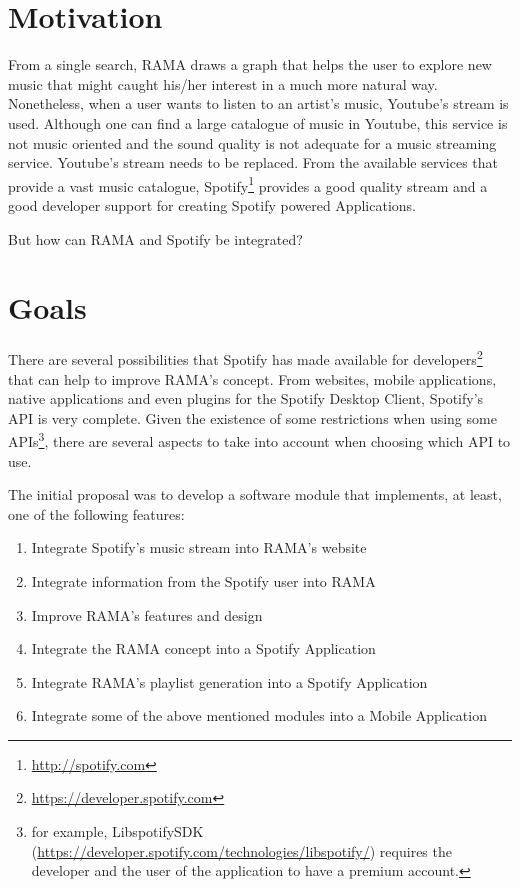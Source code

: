 \section{Motivation} \label{sec:motivation}

  From a single search, RAMA draws a graph that helps the user to explore new music that might caught his/her interest in a much more natural way.
  Nonetheless, when a user wants to listen to an artist's music, Youtube's stream is used.
  Although one can find a large catalogue of music in Youtube, this service is not music oriented and the sound quality is not adequate for a music streaming service.
  Youtube's stream needs to be replaced.
  From the available services that provide a vast music catalogue, Spotify\footnote{\url{http://spotify.com}} provides a good quality stream and a good developer support for creating Spotify powered Applications.

  But how can RAMA and Spotify be integrated? \\

\section{Goals}
\label{sec:goals}

  There are several possibilities that Spotify has made available for developers\footnote{\url{https://developer.spotify.com}} that can help to improve RAMA's concept.
  From websites, mobile applications, native applications and even plugins for the Spotify Desktop Client, Spotify's API is very complete.
  Given the existence of some restrictions when using some APIs\footnote{for example, LibspotifySDK (\url{https://developer.spotify.com/technologies/libspotify/}) requires the developer and the user of the application to have a premium account.}, there are several aspects to take into account when choosing which API to use.

  The initial proposal was to develop a software module that implements, at least, one of the following features:

  \begin{enumerate}
    \item \label{intro:obj1} Integrate Spotify's music stream into RAMA's website
    \item \label{intro:obj2} Integrate information from the Spotify user into RAMA
    \item \label{intro:obj3} Improve RAMA's features and design
    \item \label{intro:obj4} Integrate the RAMA concept into a Spotify Application
    \item \label{intro:obj5} Integrate RAMA's playlist generation into a Spotify Application
    \item \label{intro:obj6} Integrate some of the above mentioned modules into a Mobile Application
  \end{enumerate}

